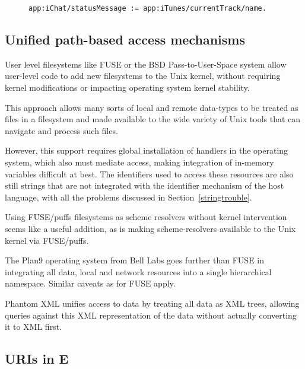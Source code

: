 \documentclass[preprint,authoryear]{acm_proc_article-sp}
\begin{document}
\begin{figure}[htbp]
\begin{lstlisting}[style=L,label=NonAppleScript,caption=Access to applications via \emph{polymorphic identifiers}.]
  app:iChat/statusMessage := app:iTunes/currentTrack/name.
\end{lstlisting}
\end{figure}


\subsection{Unified path-based access mechanisms}


User level filesystems like FUSE\cite{fuse} or the BSD Pass-to-User-Space\cite{puffs} 
system allow
user-level code to add new filesystems to the Unix kernel, without requiring
kernel modifications or impacting operating system kernel stability.

This approach allows many sorts of local and remote data-types to be 
treated as files in a filesystem and made available to the wide variety
of Unix tools that can navigate and process such files.  

However, this support requires global installation of handlers in the operating
system, which also must mediate access, making integration of in-memory 
variables difficult at best.  The identifiers used to access these resources
are also still strings that are not integrated with the identifier mechanism of
the host language, with all the problems discussed in Section~\ref{stringtrouble}.

Using FUSE/puffs filesystems as scheme resolvers without kernel intervention seems
like a useful addition, as is making scheme-resolvers available to the Unix kernel
via FUSE/puffs.

The Plan9\cite{plan9names}\cite{plan9network} operating system from Bell Labs goes further than FUSE in integrating
all data, local and network resources into a single hierarchical namespace.  Similar
caveats as for FUSE apply.

Phantom XML\cite{phantomxml} unifies access to data by treating all data as
XML trees, allowing queries against this XML representation of the data without
actually converting it to XML first.  




\subsection{URIs in E}
\end{document}
